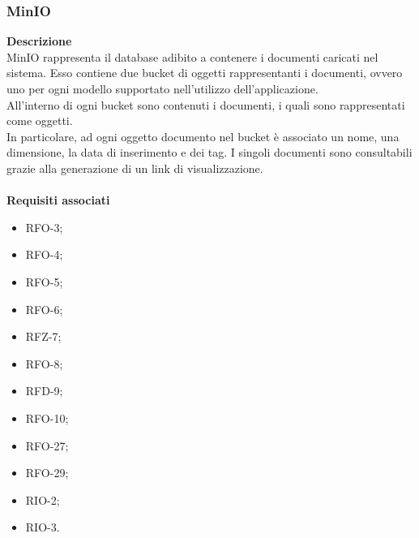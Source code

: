 \subsubsection{MinIO}
\textbf{Descrizione}\\
MinIO rappresenta il database adibito a contenere i documenti caricati nel sistema. Esso contiene due bucket di oggetti rappresentanti i documenti, ovvero uno per ogni modello supportato nell'utilizzo dell'applicazione.\\
All'interno di ogni bucket sono contenuti i documenti, i quali sono rappresentati come oggetti.\\
In particolare, ad ogni oggetto documento nel bucket è associato un nome, una dimensione, la data di inserimento e dei tag. I singoli documenti sono consultabili grazie alla generazione di un link di visualizzazione.\\ \\
\textbf{Requisiti associati}
\begin{itemize}[itemsep=-4pt]
    \item RFO-3;
    \item RFO-4;
    \item RFO-5;
    \item RFO-6;
    \item RFZ-7;
    \item RFO-8;
    \item RFD-9;
    \item RFO-10;
    \item RFO-27;
    \item RFO-29;
    \item RIO-2;
    \item RIO-3.
\end{itemize}

